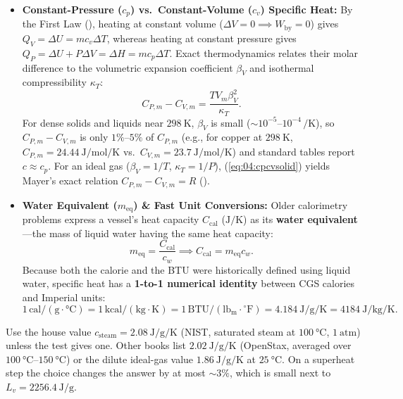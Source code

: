 \begin{itemize}
  \item \textbf{Constant-Pressure ($c_p$) vs.\ Constant-Volume ($c_v$) Specific Heat:} By the First Law (), heating at constant volume ($\Delta V = 0 \implies W_{\mathrm{by}} = 0$) gives $Q_V = \Delta U = m c_v \Delta T$, whereas heating at constant pressure gives $Q_P = \Delta U + P\Delta V = \Delta H = m c_p \Delta T$. Exact thermodynamics relates their molar difference to the volumetric expansion coefficient $\beta_V$ and isothermal compressibility $\kappa_T$:
  \begin{equation}\label{eq:04:cpcvsolid}
    C_{P,m} - C_{V,m} = \frac{T V_m \beta_V^2}{\kappa_T}.
  \end{equation}
  For dense solids and liquids near $\SI{298}{\kelvin}$, $\beta_V$ is small ($\sim 10^{-5}\text{--}10^{-4}\,\si{\per\kelvin}$), so $C_{P,m} - C_{V,m}$ is only $1\%\text{--}5\%$ of $C_{P,m}$ (e.g., for copper at $\SI{298}{\kelvin}$, $C_{P,m} = \SI{24.44}{\joule\per\mole\per\kelvin}$ vs.\ $C_{V,m} = \SI{23.7}{\joule\per\mole\per\kelvin}$) and standard tables report $c \approx c_p$. For an ideal gas ($\beta_V = 1/T$, $\kappa_T = 1/P$), (\ref{eq:04:cpcvsolid}) yields Mayer's exact relation $C_{P,m} - C_{V,m} = R$ ().
  \item \textbf{Water Equivalent ($m_{\mathrm{eq}}$) \& Fast Unit Conversions:} Older calorimetry problems express a vessel's heat capacity $C_{\mathrm{cal}}$ ($\si{\joule\per\kelvin}$) as its \textbf{water equivalent}---the mass of liquid water having the same heat capacity:
  \begin{equation}\label{eq:04:watereq}
    m_{\mathrm{eq}} = \frac{C_{\mathrm{cal}}}{c_w} \implies C_{\mathrm{cal}} = m_{\mathrm{eq}} c_w.
  \end{equation}
  Because both the calorie and the BTU were historically defined using liquid water, specific heat has a \textbf{1-to-1 numerical identity} between CGS calories and Imperial units:
  \begin{equation}\label{eq:04:unitidentity}
    1\,\mathrm{cal/(g\cdot\si{\celsius})} = 1\,\mathrm{kcal/(kg\cdot\si{\kelvin})} = 1\,\mathrm{BTU/(lb_m\cdot{}^\circ\mathrm{F})} = \SI{4.184}{\joule\per\gram\per\kelvin} = \SI{4184}{\joule\per\kilogram\per\kelvin}.
  \end{equation}
\end{itemize}

\begin{shortcut}
Use the house value $c_{\mathrm{steam}} = \SI{2.08}{\joule\per\gram\per\kelvin}$ (NIST, saturated steam at $\SI{100}{\celsius}$, $\SI{1}{\text{atm}}$) unless the test gives one. Other books list $\SI{2.02}{\joule\per\gram\per\kelvin}$ (OpenStax, averaged over $\SIrange{100}{150}{\celsius}$) or the dilute ideal-gas value $\SI{1.86}{\joule\per\gram\per\kelvin}$ at $\SI{25}{\celsius}$. On a superheat step the choice changes the answer by at most $\sim 3\%$, which is small next to $L_v = \SI{2256.4}{\joule\per\gram}$.
\end{shortcut}

